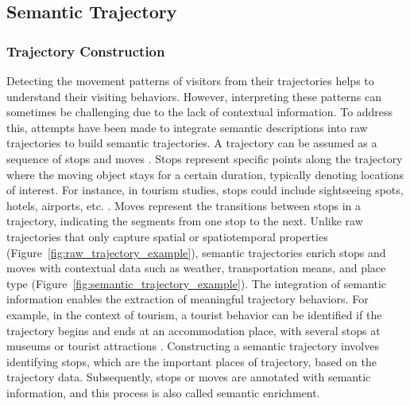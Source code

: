 \documentclass{article}
\theoremstyle{remark}
\begin{document}
\subsection{Semantic Trajectory} \label{semantic_trajectory}

\subsubsection{Trajectory Construction}
Detecting the movement patterns of visitors from their trajectories helps to understand their visiting behaviors. However, interpreting these patterns can sometimes be challenging due to the lack of contextual information. To address this, attempts have been made to integrate semantic descriptions into raw trajectories to build semantic trajectories. A trajectory can be assumed as a sequence of stops and moves \citep{spaccapietra_conceptual_2008}. Stops represent specific points along the trajectory where the moving object stays for a certain duration, typically denoting locations of interest. For instance, in tourism studies, stops could include sightseeing spots, hotels, airports, etc. \citep{yuan_review_2017}. Moves represent the transitions between stops in a trajectory, indicating the segments from one stop to the next. Unlike raw trajectories that only capture spatial or spatiotemporal properties (Figure~\ref{fig:raw_trajectory_example}), semantic trajectories enrich stops and moves with contextual data such as weather, transportation means, and place type (Figure~\ref{fig:semantic_trajectory_example}). The integration of semantic information enables the extraction of meaningful trajectory behaviors. For example, in the context of tourism, a tourist behavior can be identified if the trajectory begins and ends at an accommodation place, with several stops at museums or tourist attractions \citep{parent_semantic_2013}. Constructing a semantic trajectory involves identifying stops, which are the important places of trajectory, based on the trajectory data. Subsequently, stops or moves are annotated with semantic information, and this process is also called semantic enrichment.
\end{document}
